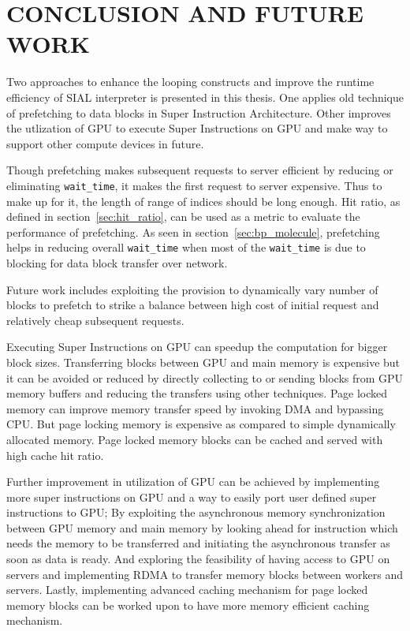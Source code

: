 \chapter{CONCLUSION AND FUTURE WORK}\label{conclusion}
Two approaches to enhance the looping constructs and improve the runtime efficiency
of SIAL interpreter is presented in this thesis. One applies old technique of
prefetching to data blocks in Super Instruction Architecture. Other improves
the utlization of GPU to execute Super Instructions on GPU and make way to support
other compute devices in future.

Though prefetching makes subsequent requests to server efficient by reducing or
eliminating \texttt{wait\_time}, it makes the first request to server expensive.
Thus to make up for it, the length of range of indices should be long enough. Hit
ratio, as defined in section~\ref{sec:hit_ratio}, can be used as a metric to evaluate
the performance of prefetching. As seen in section~\ref{sec:bp_molecule}, prefetching
helps in reducing overall \texttt{wait\_time} when most of the \texttt{wait\_time}
is due to blocking for data block transfer over network.

Future work includes exploiting the provision to dynamically vary number of blocks
to prefetch to strike a balance between high cost of initial request and relatively
cheap subsequent requests.

Executing Super Instructions on GPU can speedup the computation for bigger block
sizes. Transferring blocks between GPU and main memory is expensive but it can be
avoided or reduced by directly collecting to or sending blocks from GPU memory
buffers and reducing the transfers using other techniques. Page locked memory
can improve memory transfer speed by invoking DMA and bypassing CPU. But page locking
memory is expensive as compared to simple dynamically allocated memory. Page locked
memory blocks can be cached and served with high cache hit ratio.

Further improvement in utilization of GPU can be achieved by implementing more
super instructions on GPU and a way to easily port user defined super instructions
to GPU; By exploiting the asynchronous memory synchronization between GPU memory
and main memory by looking ahead for instruction which needs the memory
to be transferred and initiating the asynchronous transfer as soon as data is ready.
And exploring the feasibility of having access to GPU on servers and implementing
RDMA to transfer memory blocks between workers and servers. Lastly, implementing
advanced caching mechanism for page locked memory blocks can be worked upon to have
more memory efficient caching mechanism.